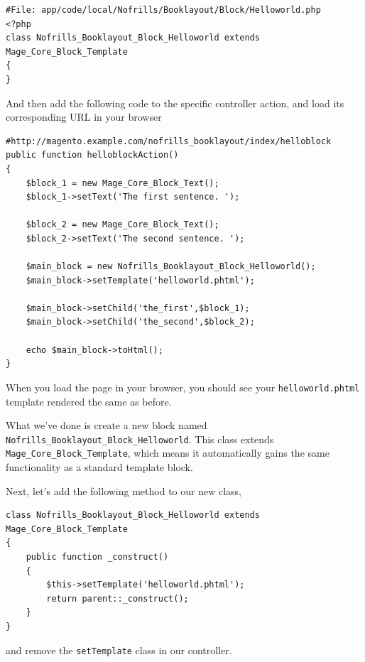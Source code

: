 \documentclass[oneside]{book}
\begin{document}
\begin{lstlisting}
#File: app/code/local/Nofrills/Booklayout/Block/Helloworld.php
<?php
class Nofrills_Booklayout_Block_Helloworld extends Mage_Core_Block_Template
{
}   

\end{lstlisting}


And then add the following code to the specific controller action, and load its corresponding URL in your browser

\begin{lstlisting}
#http://magento.example.com/nofrills_booklayout/index/helloblock
public function helloblockAction()
{
    $block_1 = new Mage_Core_Block_Text();
    $block_1->setText('The first sentence. ');

    $block_2 = new Mage_Core_Block_Text();
    $block_2->setText('The second sentence. ');     

    $main_block = new Nofrills_Booklayout_Block_Helloworld();
    $main_block->setTemplate('helloworld.phtml');           

    $main_block->setChild('the_first',$block_1);
    $main_block->setChild('the_second',$block_2);

    echo $main_block->toHtml();
}

\end{lstlisting}


When you load the page in your browser, you should see your \footnotesize\texttt{helloworld.phtml} \normalsize  template rendered the same as before.

What we've done is create a new block named \footnotesize\texttt{Nofrills\_Booklayout\_Block\_Helloworld}\normalsize. This class extends \footnotesize\texttt{Mage\_Core\_Block\_Template}\normalsize, which means it automatically gains the same functionality as a standard template block.  

Next, let's add the following method to our new class, 

\begin{lstlisting}
class Nofrills_Booklayout_Block_Helloworld extends Mage_Core_Block_Template
{
    public function _construct()
    {
        $this->setTemplate('helloworld.phtml');
        return parent::_construct();
    }
}   

\end{lstlisting}


and remove the \footnotesize\texttt{setTemplate} \normalsize  class in our controller.
\end{document}
